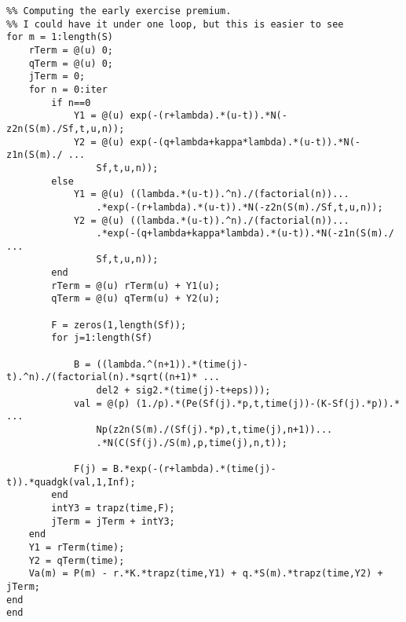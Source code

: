 \begin{lstlisting}
%% Computing the early exercise premium. 
%% I could have it under one loop, but this is easier to see
for m = 1:length(S)
    rTerm = @(u) 0;
    qTerm = @(u) 0;
    jTerm = 0;
    for n = 0:iter
        if n==0
            Y1 = @(u) exp(-(r+lambda).*(u-t)).*N(-z2n(S(m)./Sf,t,u,n));
            Y2 = @(u) exp(-(q+lambda+kappa*lambda).*(u-t)).*N(-z1n(S(m)./ ...
                Sf,t,u,n));
        else
            Y1 = @(u) ((lambda.*(u-t)).^n)./(factorial(n))...
                .*exp(-(r+lambda).*(u-t)).*N(-z2n(S(m)./Sf,t,u,n));
            Y2 = @(u) ((lambda.*(u-t)).^n)./(factorial(n))...
                .*exp(-(q+lambda+kappa*lambda).*(u-t)).*N(-z1n(S(m)./ ...
                Sf,t,u,n));
        end
        rTerm = @(u) rTerm(u) + Y1(u);
        qTerm = @(u) qTerm(u) + Y2(u);
    
        F = zeros(1,length(Sf));
        for j=1:length(Sf)
            
            B = ((lambda.^(n+1)).*(time(j)-t).^n)./(factorial(n).*sqrt((n+1)* ...
                del2 + sig2.*(time(j)-t+eps)));
            val = @(p) (1./p).*(Pe(Sf(j).*p,t,time(j))-(K-Sf(j).*p)).* ...
                Np(z2n(S(m)./(Sf(j).*p),t,time(j),n+1))...
                .*N(C(Sf(j)./S(m),p,time(j),n,t));

            F(j) = B.*exp(-(r+lambda).*(time(j)-t)).*quadgk(val,1,Inf);
        end
        intY3 = trapz(time,F);
        jTerm = jTerm + intY3;
    end
    Y1 = rTerm(time);
    Y2 = qTerm(time);
    Va(m) = P(m) - r.*K.*trapz(time,Y1) + q.*S(m).*trapz(time,Y2) + jTerm;
end
end
\end{lstlisting}